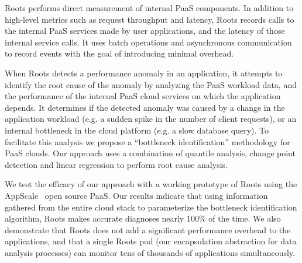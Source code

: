 Roots performs direct measurement of internal PaaS components.
In addition to high-level metrics such as request throughput
and latency, Roots records calls to the internal PaaS services made by user applications,
and the latency of those internal service calls. It uses batch operations and asynchronous 
communication to record events with the goal of introducing minimal overhead.

When Roots detects a performance anomaly in an application, it attempts to
identify the root cause of the anomaly by analyzing the PaaS workload data,
and the performance of the internal PaaS cloud services on which the application depends.
It determines if the detected anomaly was caused by a change in the
application workload (e.g. a sudden spike in the number of client requests), or an internal
bottleneck in the cloud platform (e.g. a slow database query). To facilitate
this analysis we propose a ``bottleneck identification'' methodology
for PaaS clouds. 
Our approach uses a combination of quantile analysis, change point detection
and linear regression to perform root cause analysis. 

We test the efficacy of our approach with a working prototype of 
Roots using the AppScale~\cite{6488671} open source PaaS. 
Our results indicate that using information gathered from the entire cloud
stack to parameterize the bottleneck identification algorithm, Roots
makes accurate diagnoses nearly 100\% of the time. 
We also demonstrate that Roots does not add a significant performance overhead
to the applications, and that a single Roots pod (our encapsulation abstraction for
data analysis processes) can monitor tens of thousands
of applications simultaneously.


